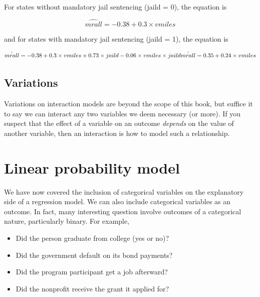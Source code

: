 \documentclass[
]{book}
\providecommand{\tightlist}{%
  \setlength{\itemsep}{0pt}\setlength{\parskip}{0pt}}
\begin{document}
For states without mandatory jail sentencing (jaild = 0), the equation is

\begin{equation}
\hat{mrall} = -0.38 + 0.3\times vmiles
\label{eq:interactionex0}
\end{equation}

and for states with mandatory jail sentencing (jaild = 1), the equation is

\begin{equation}
\hat{mrall} = -0.38 + 0.3\times vmiles + 0.73\times jaild - 0.06\times vmiles \times jaild\\
\hat{mrall} = 0.35 + 0.24\times vmiles
\label{eq:interactionex1}
\end{equation}

\hypertarget{variations-1}{%
\subsection{Variations}\label{variations-1}}

Variations on interaction models are beyond the scope of this book, but suffice it to say we can interact any two variables we deem necessary (or more). If you suspect that the effect of a variable on an outcome \emph{depends} on the value of another variable, then an interaction is how to model such a relationship.

\hypertarget{linear-probability-model}{%
\section{Linear probability model}\label{linear-probability-model}}

We have now covered the inclusion of categorical variables on the explanatory side of a regression model. We can also include categorical variables as an outcome. In fact, many interesting question involve outcomes of a categorical nature, particularly binary. For example,

\begin{itemize}
\tightlist
\item
  Did the person graduate from college (yes or no)?
\item
  Did the government default on its bond payments?
\item
  Did the program participant get a job afterward?
\item
  Did the nonprofit receive the grant it applied for?
\end{itemize}
\end{document}
